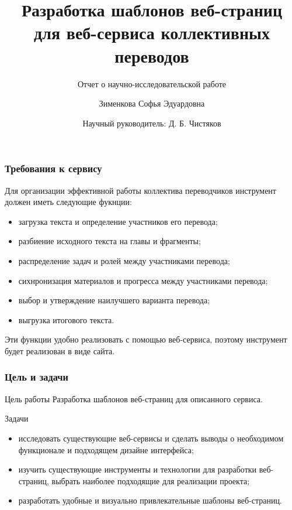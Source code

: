 \documentclass[hyperref={unicode}]{beamer}
\title[%
		Шаблоны страниц сайта для переводов
]{%
		Разработка шаблонов веб-страниц\\
		для веб-сервиса коллективных переводов
}
\subtitle{Отчет о научно-исследовательской работе}
\author[%
		Зименкова Софья
]{%
		Зименкова Софья Эдуардовна
}
\date[%
		22.05.2023
]{%
		Научный руководитель: Д. Б. Чистяков
}
\institute[%
		ПетрГУ
]{%
		Петрозаводский государственный университет\\
		Кафедра Информатики и Математического Обеспечения
}
\begin{document}
\begin{frame}
\maketitle
\end{frame}


\begin{frame}
	
	\frametitle{Требования к сервису}
	Для организации эффективной работы коллектива переводчиков инструмент должен иметь следующие фукнции:
 \begin{itemize}
		\item загрузка текста и определение участников его перевода;
		\item разбиение исходного текста на главы и фрагменты;
		\item распределение задач и ролей между участниками перевода;
		\item сихнронизация материалов и прогресса между участниками перевода;
		\item выбор и утверждение наилучшего варианта перевода;
		\item выгрузка итогового текста.
	\end{itemize}
	
	Эти функции удобно реализовать с помощью веб-сервиса, поэтому инструмент будет реализован в виде сайта.
\end{frame}


\begin{frame}
	\frametitle{Цель и задачи}
	\begin{block}{Цель работы}
		Разработка шаблонов веб-страниц для описанного сервиса.
	\end{block}
	\begin{block}{Задачи}
	\begin{itemize}
		\item исследовать существующие веб-сервисы и сделать выводы о необходимом функционале и подходящем дизайне интерфейса;
		\item изучить существующие инструменты и технологии для разработки веб-страниц, выбрать наиболее подходящие для реализации проекта;
		\item разработать удобные и визуально привлекательные шаблоны веб-страниц.
	\end{itemize}
	\end{block}
\end{frame}
\end{document}
